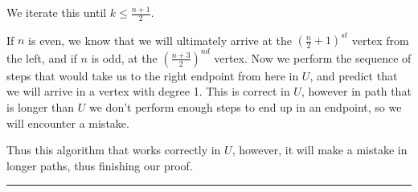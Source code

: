 \documentclass{article}
\begin{document}
	We iterate this until \(\displaystyle k\le \frac{n+1}{2}\).
	
	If \(\displaystyle n\) is even, we know that we will ultimately arrive at the \(\displaystyle \left(\frac{n}{2}+1\right)^{st}\) vertex from the left, and if \(\displaystyle n\) is odd, at the \(\displaystyle \left(\frac{n+3}{2}\right)^{nd}\) vertex. Now we perform the sequence of steps that would take us to the right endpoint from here in \(\displaystyle U\), and predict that we will arrive in a vertex with degree 1. This is correct in \(\displaystyle U\), however in path that is longer than \(\displaystyle U\) we don't perform enough steps to end up in an endpoint, so we will encounter a mistake.
	
	Thus this algorithm that works correctly in \(\displaystyle U\), however, it will make a mistake in longer paths, thus finishing our proof.
	
	\vspace{2em}
	\hrule
	\vspace{2em}
	
\end{document}

